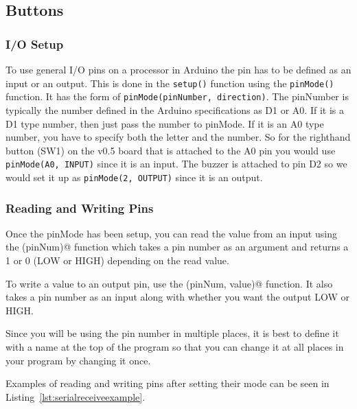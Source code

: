 \subsection{Buttons}
\subsubsection{I/O Setup}
To use general I/O pins on a processor in Arduino the pin has to be defined as an 
input or an output. This is done in the \lstinline$setup()$ function using the 
\lstinline$pinMode()$ function. It has the form of 
\lstinline$pinMode(pinNumber, direction)$. The pinNumber is typically the number 
defined in the Arduino specifications as D1 or A0. If it is a D1 type number, then
just pass the number to pinMode. If it is an A0 type number, you have to specify 
both the letter and the number. So for the righthand button (SW1) on the v0.5 board 
that is attached to the A0 pin you would use \lstinline$pinMode(A0, INPUT)$ since
it is an input. The buzzer is attached to pin D2 so we would set it up as 
\lstinline$pinMode(2, OUTPUT)$ since it is an output. 

\subsubsection{Reading and Writing Pins}
Once the pinMode has been setup, you can read the value from an input using the 
\lstinline@digitalRead(pinNum)@ function which takes a pin number as an argument
and returns a 1 or 0 (LOW or HIGH) depending on the read value.

To write a value to an output pin, use the \lstinline@digitalWrite(pinNum, value)@ 
function. It also takes a pin number as an input along with whether you want the 
output LOW or HIGH. 

Since you will be using the pin number in multiple places, it is best to define it 
with a name at the top of the program so that you can change it at all places in 
your program by changing it once.

Examples of reading and writing pins after setting their mode can be seen in 
Listing~\ref{lst:serialreceiveexample}.

